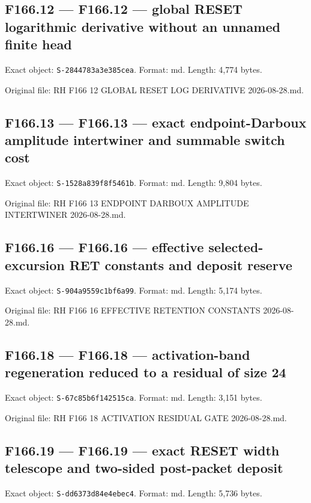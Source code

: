 \documentclass[
  10pt,
  a4paper,
  10pt,
  oneside,
  openany]{book}
\begin{document}
\subsection{F166.12 --- F166.12 --- global RESET logarithmic derivative
without an unnamed finite head}\label{source-f166-12}

Exact object: \texttt{S-2844783a3e385cea}. Format: md. Length: 4,774
bytes.

Original file: RH F166 12 GLOBAL RESET LOG DERIVATIVE 2026-08-28.md.

\subsection{F166.13 --- F166.13 --- exact endpoint-Darboux amplitude
intertwiner and summable switch cost}\label{source-f166-13}

Exact object: \texttt{S-1528a839f8f5461b}. Format: md. Length: 9,804
bytes.

Original file: RH F166 13 ENDPOINT DARBOUX AMPLITUDE INTERTWINER
2026-08-28.md.

\subsection{F166.16 --- F166.16 --- effective selected-excursion RET
constants and deposit reserve}\label{source-f166-16}

Exact object: \texttt{S-904a9559c1bf6a99}. Format: md. Length: 5,174
bytes.

Original file: RH F166 16 EFFECTIVE RETENTION CONSTANTS 2026-08-28.md.

\subsection{F166.18 --- F166.18 --- activation-band regeneration reduced
to a residual of size 24}\label{source-f166-18}

Exact object: \texttt{S-67c85b6f142515ca}. Format: md. Length: 3,151
bytes.

Original file: RH F166 18 ACTIVATION RESIDUAL GATE 2026-08-28.md.

\subsection{F166.19 --- F166.19 --- exact RESET width telescope and
two-sided post-packet deposit}\label{source-f166-19}

Exact object: \texttt{S-dd6373d84e4ebec4}. Format: md. Length: 5,736
bytes.
\end{document}
